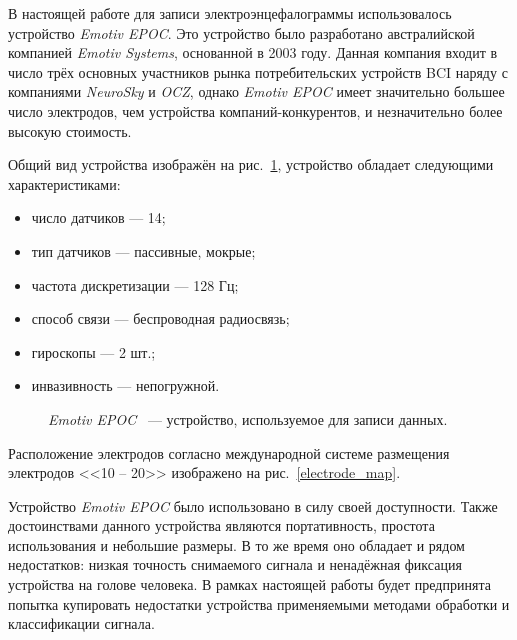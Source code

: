 \documentclass[12pt,fleqn]{article}
\begin{document}
	
	\par В настоящей работе для записи электроэнцефалограммы использовалось устройство {\it Emotiv EPOC}. Это устройство было разработано австралийской компанией {\it Emotiv Systems}, основанной в 2003 году. Данная компания входит в число трёх основных участников рынка потребительских устройств BCI наряду с компаниями {\it NeuroSky} и {\it OCZ}, однако {\it Emotiv EPOC} имеет значительно большее число электродов, чем устройства компаний-конкурентов, и незначительно более высокую стоимость. 
	\par Общий вид устройства изображён на рис.~\ref{Emotiv}, устройство обладает следующими характеристиками:
	\begin{itemize}\itemsep0pt
	\item
	число датчиков — 14;
	\item
	тип датчиков — пассивные, мокрые;
	\item
	частота дискретизации — 128 Гц;
	\item
	способ связи — беспроводная радиосвязь;
	\item
	гироскопы — 2 шт.;
	\item
	инвазивность — непогружной.
	\end{itemize}

	\begin{figure}[h]
	\caption{{\it Emotiv EPOC} ~--- устройство, используемое для записи данных.}
	\label{Emotiv}
	\end{figure}

	\par Расположение электродов согласно международной системе размещения электродов <<10 -- 20>> изображено на рис.~\ref{electrode_map}.
	\par Устройство {\it Emotiv EPOC} было использовано в силу своей доступности. Также достоинствами данного устройства являются портативность, простота использования и небольшие размеры. В то же время оно обладает и рядом недостатков: низкая точность снимаемого сигнала и ненадёжная фиксация устройства на голове человека. В рамках настоящей работы будет предпринята попытка купировать недостатки устройства применяемыми методами обработки и классификации сигнала.
\end{document}

